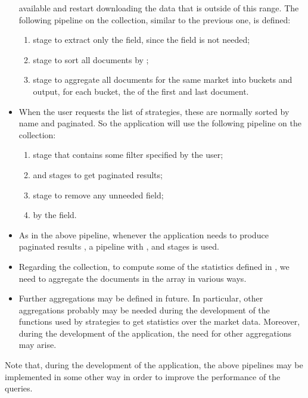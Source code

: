 \begin{itemize}
		available and restart downloading the data that is outside of
		this range. The following pipeline on the 
		collection, similar to the previous one, is defined:
		\begin{enumerate}
			\item {} stage to extract only the
				 field, since the  field
				is not needed;
			\item {} stage to sort all documents by
				;
			\item {} stage to aggregate all documents
				for the same market into buckets and output, for
				each bucket, the  of the first and
				last document.
		\end{enumerate}
	\item When the user requests the list of strategies, these are normally
		sorted by name and paginated. So the application will use the
		following pipeline on the  collection:
		\begin{enumerate}
			\item {} stage that contains some filter
				specified by the user;
			\item {} and  stages to get
				paginated results;
			\item {} stage to remove any unneeded
				field;
			\item {} by the  field.
		\end{enumerate}
	\item As in the above pipeline, whenever the application needs to
		produce paginated results , a pipeline with , 
		and  stages is used.
	\item Regarding the  collection, to compute some of the
		statistics defined in , we need to aggregate the
		documents in the  array in various ways.
	\item Further aggregations may be defined in future. In particular,
		other aggregations probably may be needed during the development
		of the functions used by strategies to get statistics over the
		market data. Moreover, during the development of the
		application, the need for other aggregations may arise.
\end{itemize}

Note that, during the development of the application, the above pipelines may be
implemented in some other way 
in order to improve the performance of the queries.
